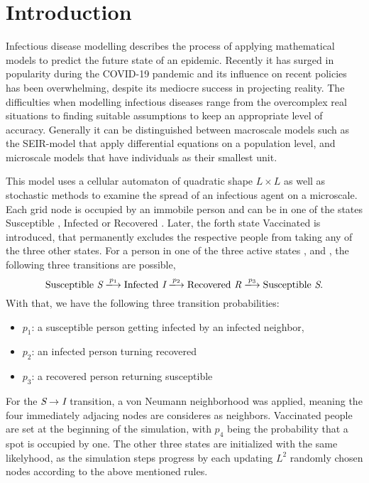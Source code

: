 \section{Introduction}

Infectious disease modelling describes the process of applying mathematical models to predict the future state of an epidemic. 
Recently it has surged in popularity during the COVID-19 pandemic and its influence on recent policies has been overwhelming, despite its mediocre success in projecting reality. 
The difficulties when modelling infectious diseases range from the overcomplex real situations to finding suitable assumptions to keep an appropriate level of accuracy.
Generally it can be distinguished between macroscale models such as the SEIR-model\cite{SEIR_Heidelberg} that apply differential equations on a population level, 
and microscale models that have individuals as their smallest unit.

This model uses a cellular automaton\cite{CellularAutomaton} of quadratic shape $L\times L$ as well as stochastic methods to examine the spread of an infectious agent on a microscale. 
Each grid node is occupied by an immobile person and can be in one of the states Susceptible \susceptible{}, Infected \infected{} or Recovered \recovered{}. Later, the forth state Vaccinated \vaccinated{} is introduced, 
that permanently excludes the respective people from taking any of the three other states. 
For a person in one of the three active states \susceptible{}, \infected{} and \recovered{}, the following three transitions are possible,
\begin{equation*}
    \mathrm{Susceptible}~\susceptible\xlongrightarrow{p_1}\mathrm{Infected}~\infected{}\xlongrightarrow{p_2}\mathrm{Recovered}~\recovered{}\xlongrightarrow{p_3}\mathrm{Susceptible}~\susceptible{}.
\end{equation*}
With that, we have the following three transition probabilities:
\begin{itemize}
    \item $p_1$: a susceptible person getting infected by an infected neighbor,
    \item $p_2$: an infected person turning recovered
    \item $p_3$: a recovered person returning susceptible
\end{itemize}
For the $\textit{S}{}\rightarrow\textit{I}{}$ transition, a von Neumann neighborhood was applied, meaning the four immediately adjacing nodes are consideres as neighbors.\cite{CellularAutomaton} 
Vaccinated people \vaccinated{} are set at the beginning of the simulation, with $p_4$ being the probability that a spot is occupied by one. The other three states are initialized with the same likelyhood, as the 
simulation steps progress by each updating $L^2$ randomly chosen nodes according to the above mentioned rules.

